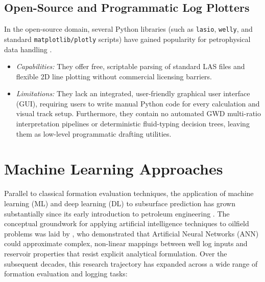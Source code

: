\subsection{Open-Source and Programmatic Log Plotters}
In the open-source domain, several Python libraries (such as \texttt{lasio}, \texttt{welly}, and standard \texttt{matplotlib/plotly} scripts) have gained popularity for petrophysical data handling \citep{wood2020}.
\begin{itemize}
    \item \textit{Capabilities:} They offer free, scriptable parsing of standard LAS files and flexible 2D line plotting without commercial licensing barriers.
    \item \textit{Limitations:} They lack an integrated, user-friendly graphical user interface (GUI), requiring users to write manual Python code for every calculation and visual track setup. Furthermore, they contain no automated GWD multi-ratio interpretation pipelines or deterministic fluid-typing decision trees, leaving them as low-level programmatic drafting utilities.
\end{itemize}

\section{Machine Learning Approaches}

Parallel to classical formation evaluation techniques, the application of machine learning (ML) and deep learning (DL) to subsurface prediction has grown substantially since its early introduction to petroleum engineering \citep{ref1}. The conceptual groundwork for applying artificial intelligence techniques to oilfield problems was laid by \citet{ref1}, who demonstrated that Artificial Neural Networks (ANN) could approximate complex, non-linear mappings between well log inputs and reservoir properties that resist explicit analytical formulation. Over the subsequent decades, this research trajectory has expanded across a wide range of formation evaluation and logging tasks:

